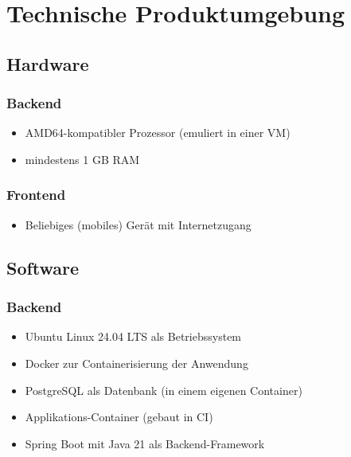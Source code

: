 

\chapter{Technische Produktumgebung}
\label{chap:tech_env}

\section{Hardware}

\subsection{Backend}

\begin{itemize}
    \item AMD64-kompatibler Prozessor (emuliert in einer VM)
    \item mindestens 1 GB RAM
\end{itemize}

\subsection{Frontend}

\begin{itemize}
    \item Beliebiges (mobiles) Gerät mit Internetzugang
\end{itemize}

\section{Software}

\subsection{Backend}

\begin{itemize}
    \item Ubuntu Linux 24.04 LTS als Betriebssystem
    \item Docker zur Containerisierung der Anwendung
    \item PostgreSQL als Datenbank (in einem eigenen Container)
    \item Applikations-Container (gebaut in CI)
    \item Spring Boot mit Java 21 als Backend-Framework
\end{itemize}

